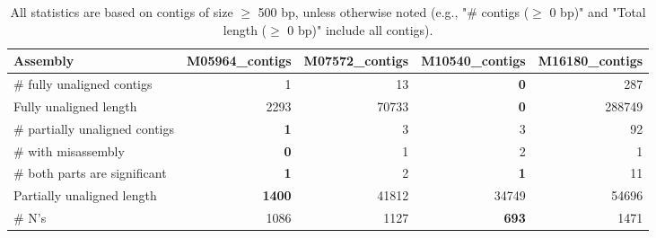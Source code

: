 \documentclass[12pt,a4paper]{article}
\begin{document}
\begin{table}[ht]
\begin{center}
\caption{All statistics are based on contigs of size $\geq$ 500 bp, unless otherwise noted (e.g., "\# contigs ($\geq$ 0 bp)" and "Total length ($\geq$ 0 bp)" include all contigs).}
\begin{tabular}{|l*{4}{|r}|}
\hline
Assembly & M05964\_contigs & M07572\_contigs & M10540\_contigs & M16180\_contigs \\ \hline
\# fully unaligned contigs & 1 & 13 & {\bf 0} & 287 \\ \hline
Fully unaligned length & 2293 & 70733 & {\bf 0} & 288749 \\ \hline
\# partially unaligned contigs & {\bf 1} & 3 & 3 & 92 \\ \hline
\hspace{5mm}\# with misassembly & {\bf 0} & 1 & 2 & 1 \\ \hline
\hspace{5mm}\# both parts are significant & {\bf 1} & 2 & {\bf 1} & 11 \\ \hline
Partially unaligned length & {\bf 1400} & 41812 & 34749 & 54696 \\ \hline
\# N's & 1086 & 1127 & {\bf 693} & 1471 \\ \hline
\end{tabular}
\end{center}
\end{table}
\end{document}
